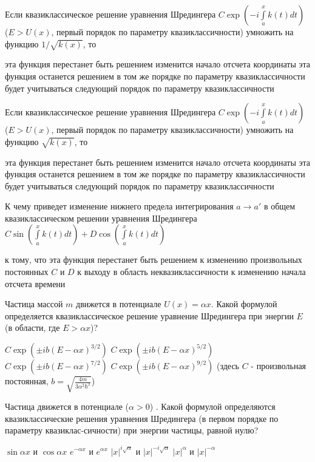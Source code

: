 \documentclass[11pt,a4paper]{exam}
\begin{document}
\begin{questions}
\question Если квазиклассическое решение уравнения Шредингера $C\exp \left( { - i\int\limits_a^x {k(t)dt} } \right)$ ($E > U(x)$, первый порядок по параметру квазиклассичности) умножить на функцию $1/\sqrt {k(x)} $, то  
\begin{choices}
\choice эта функция перестанет быть решением
\choice изменится начало отсчета координаты
\choice эта функция останется решением в том же порядке по параметру квазиклассичности
\choice будет учитываться следующий порядок по параметру квазиклассичности
\end{choices}

\question Если квазиклассическое решение уравнения Шредингера $C\exp \left( { - i\int\limits_a^x {k(t)dt} } \right)$ ($E > U(x)$, первый порядок по параметру квазиклассичности) умножить на функцию $\sqrt {k(x)} $, то  
\begin{choices}
\choice эта функция перестанет быть решением
\choice изменится начало отсчета координаты
\choice эта функция останется решением в том же порядке по параметру квазиклассичности
\choice будет учитываться следующий порядок по параметру квазиклассичности
\end{choices}

\question К чему приведет изменение нижнего предела интегрирования $a \to a'$ в общем квазиклассическом решении уравнения Шредингера $C\sin \left( {\int\limits_a^x {k(t)dt} } \right) + D\cos \left( {\int\limits_a^x {k(t)dt} } \right)$
\begin{choices}
\choice к тому, что эта функция перестанет быть решением
\choice к изменению произвольных постоянных $C$ и $D$
\choice к выходу в область неквазиклассичности
\choice к изменению начала отсчета времени
\end{choices}

\question Частица массой $m$ движется в потенциале $U(x) = \alpha x$. Какой формулой определяется квазиклассическое решение уравнение Шредингера при энергии $E$ (в области, где $E > \alpha x$)?
\begin{choices}
\choice $C\exp \left( { \pm ib{{(E - \alpha x)}^{3/2}}} \right)$    
\choice $C\exp \left( { \pm ib{{(E - \alpha x)}^{5/2}}} \right)$
\choice $C\exp \left( { \pm ib{{(E - \alpha x)}^{7/2}}} \right)$    
\choice $C\exp \left( { \pm ib{{(E - \alpha x)}^{9/2}}} \right)$ 
(здесь $C$ - произвольная постоянная, $b = \sqrt {\frac{{4m}}{{3{\alpha ^2}{\hbar ^2}}}} $)
\end{choices}

\question Частица движется в потенциале   ($\alpha  > 0$) . Какой формулой определяются квазиклассические решения уравнения Шредингера (в первом порядке по параметру квазиклас-сичности) при энергии частицы, равной нулю?
\begin{choices}
\choice $\sin \alpha x$ и $\cos \alpha x$     
\choice ${e^{ - \alpha x}}$ и ${e^{\alpha x}}$      
\choice $|x{|^{i\sqrt \alpha  }}$ и $|x{|^{ - i\sqrt \alpha  }}$      
\choice $|x{|^\alpha }$ и $|x{|^{ - \alpha }}$
\end{choices}


\end{questions}
\end{document}
